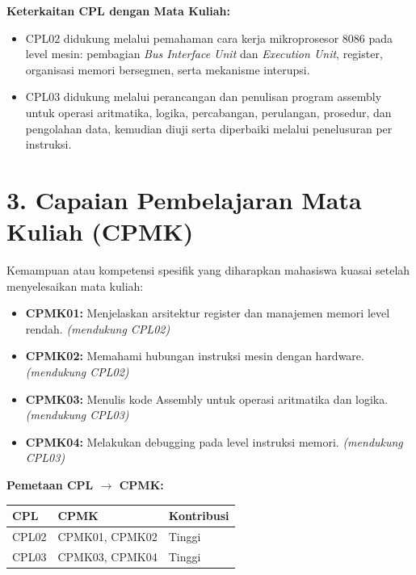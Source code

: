\documentclass[12pt,a4paper]{article}
\begin{document}
\vspace{0.3cm}

\textbf{Keterkaitan CPL dengan Mata Kuliah:}
\begin{itemize}[leftmargin=*]
  \item CPL02 didukung melalui pemahaman cara kerja mikroprosesor 8086 pada level mesin: pembagian \textit{Bus Interface Unit} dan \textit{Execution Unit}, register, organisasi memori bersegmen, serta mekanisme interupsi.
  \item CPL03 didukung melalui perancangan dan penulisan program assembly untuk operasi aritmatika, logika, percabangan, perulangan, prosedur, dan pengolahan data, kemudian diuji serta diperbaiki melalui penelusuran per instruksi.
\end{itemize}

\vspace{0.5cm}

\section*{3. Capaian Pembelajaran Mata Kuliah (CPMK)}

Kemampuan atau kompetensi spesifik yang diharapkan mahasiswa kuasai setelah menyelesaikan mata kuliah:

\begin{itemize}[leftmargin=*]
  \item \textbf{CPMK01:} Menjelaskan arsitektur register dan manajemen memori level rendah. \textit{(mendukung CPL02)}

  \item \textbf{CPMK02:} Memahami hubungan instruksi mesin dengan hardware. \textit{(mendukung CPL02)}

  \item \textbf{CPMK03:} Menulis kode Assembly untuk operasi aritmatika dan logika. \textit{(mendukung CPL03)}

  \item \textbf{CPMK04:} Melakukan debugging pada level instruksi memori. \textit{(mendukung CPL03)}
\end{itemize}

\vspace{0.3cm}

\textbf{Pemetaan CPL $\rightarrow$ CPMK:}
\begin{center}
\begin{tabular}{|l|l|l|}
\hline
\textbf{CPL} & \textbf{CPMK} & \textbf{Kontribusi} \\
\hline
CPL02 & CPMK01, CPMK02 & Tinggi \\
\hline
CPL03 & CPMK03, CPMK04 & Tinggi \\
\hline
\end{tabular}
\end{center}
\end{document}
